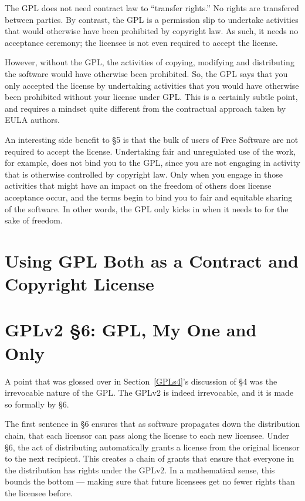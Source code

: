 The GPL does not need contract law to ``transfer rights.''  No rights
are transfered between parties. By contrast, the GPL is a permission
slip to undertake activities that would otherwise have been prohibited
by copyright law. As such, it needs no acceptance ceremony; the
licensee is not even required to accept the license.

However, without the GPL, the activities of copying, modifying and
distributing the software would have otherwise been prohibited. So, the
GPL says that you only accepted the license by undertaking activities that
you would have otherwise been prohibited without your license under GPL\@.
This is a certainly subtle point, and requires a mindset quite different
from the contractual approach taken by EULA authors.

An interesting side benefit to \S 5 is that the bulk of users of Free
Software are not required to accept the license. Undertaking fair and
unregulated use of the work, for example, does not bind you to the GPL,
since you are not engaging in activity that is otherwise controlled by
copyright law. Only when you engage in those activities that might have an
impact on the freedom of others does license acceptance occur, and the
terms begin to bind you to fair and equitable sharing of the software. In
other words, the GPL only kicks in when it needs to for the sake of
freedom.

\section{Using GPL Both as a Contract and Copyright License}

\section{GPLv2 \S 6: GPL, My One and Only}
\label{GPLs6}

A point that was glossed over in Section~\ref{GPLs4}'s discussion of \S 4
was the irrevocable nature of the GPL\@. The GPLv2 is indeed irrevocable,
and it is made so formally by \S 6.

The first sentence in \S 6 ensures that as software propagates down the
distribution chain, that each licensor can pass along the license to each
new licensee. Under \S 6, the act of distributing automatically grants a
license from the original licensor to the next recipient. This creates a
chain of grants that ensure that everyone in the distribution has rights
under the GPLv2\@. In a mathematical sense, this bounds the bottom ---
making sure that future licensees get no fewer rights than the licensee before.

